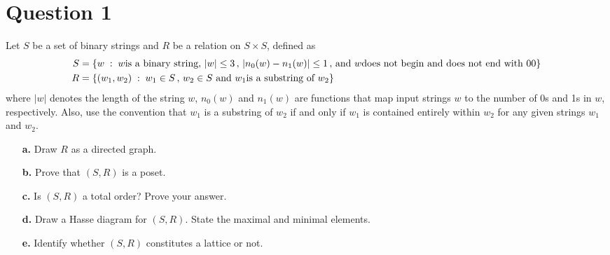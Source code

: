 \documentclass[11pt]{article}
\begin{document}
\section*{Question 1 \hfill {}}
Let $S$ be a set of binary strings and $R$ be a relation on $S \times S$, defined as
\begin{align*}
\centering
S &= \{w \;:\; w \textrm{is a binary string} , \, |w| \leq 3 \, , \, |n_0(w) - n_1(w) |\leq 1\,,\,\textrm{and } w \textrm{does not begin and does not end with } 00\}\\
R &= \{(w_1, w_2)\;:\; w_1 \in S\,,\,w_2 \in S\,\,\textrm{and } w_1 \textrm{is a substring of } w_2\}
\end{align*}
where $|w|$ denotes the length of the string $w$, $n_0(w)$ and $n_1(w)$ are functions that map input strings $w$ to the number of 0\textquotesingle s and 1\textquotesingle s in $w$, respectively. Also, use the convention that $w_1$ is a substring of $w_2$ if and only if $w_1$ is contained entirely within $w_2$ for any given strings $w_1$ and $w_2$. 
\begin{itemize}
	\item[\textbf{a.}] Draw $R$ as a directed graph. \hfill {}
	\item[\textbf{b.}] Prove that $(S,R)$ is a poset. \hfill {}
	\item[\textbf{c.}] Is $(S,R)$ a total order? Prove your answer. \hfill {}
	\item[\textbf{d.}] Draw a Hasse diagram for $(S,R)$. State the maximal and minimal elements. \hfill {}
	\item[\textbf{e.}] Identify whether $(S,R)$ constitutes a lattice or not. \hfill {}
\end{itemize}
\end{document}
